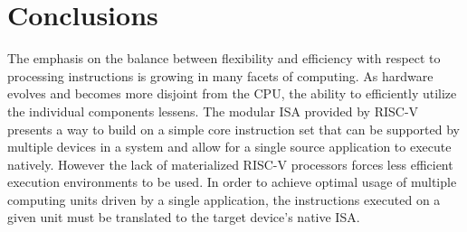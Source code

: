 \section{Conclusions}
\label{insn:concl}
The emphasis on the balance between flexibility and efficiency with respect to
processing instructions is growing in many facets of computing. As hardware
evolves and becomes more disjoint from the CPU, the ability to efficiently
utilize the individual components lessens. The modular ISA provided by RISC-V
presents a way to build on a simple core instruction set that can be supported
by multiple devices in a system and allow for a single source application to
execute natively. However the lack of materialized RISC-V processors forces
less efficient execution environments to be used. In order to achieve optimal
usage of multiple computing units driven by a single application, the
instructions executed on a given unit must be translated to the target device's
native ISA. 


